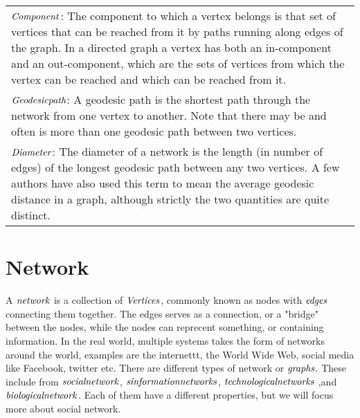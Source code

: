 \begin{table}
\begin{tabularx}{\textwidth}{|X|}
		\\

		$\it{{Component}}$: The component to which a vertex belongs is that set of vertices that can be reached from it by paths running along edges of the graph. In a directed graph a vertex has both an in-component and an out-component, which are the sets of vertices from which the vertex can be reached and which can be reached from it.

		\\

		$\it{{Geodesic path}}$: A geodesic path is the shortest path through the network from one vertex to another. Note that there may be and often is more than one geodesic path between two vertices.

		\\

		$\it{{Diameter}}$: The diameter of a network is the length (in number of edges) of the longest geodesic path between any two vertices. A few authors have also used this term to mean the average geodesic distance in a graph, although strictly the two quantities are quite distinct.\\
    \hline
    \end{tabularx}
\end{table}


\section{Network}
A $\it{network}$ is a collection of $\it{Vertices}$, commonly known as nodes with $\it{edges}$ connecting them together\cite{ComplexNetwork2003}. The edges serves as a connection, or a "bridge" between the nodes, while the nodes can reprecent something, or containing information. In the real world, multiple systems takes the form of networks around the world, examples are the internettt, the World Wide Web, social media like Facebook, twitter etc.  There are different types of network or $\it{graphs}$. These include from $\it{social network}$, $\it {sinformation networks}$, $\it{technological networks}$ ,and $\it{biological network}$.  Each of them have a different properties, but we will focus more about social network.

